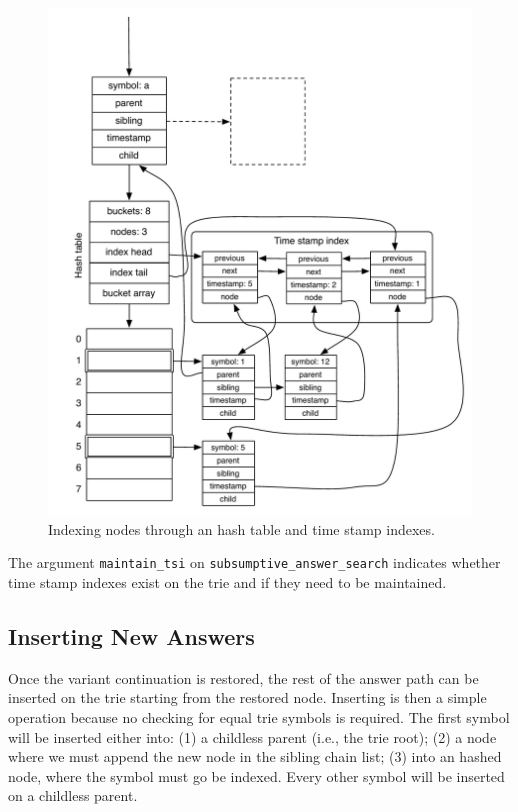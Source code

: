\begin{figure}[ht]
  \centering
    \includegraphics[scale=0.6]{hash_table_tst.pdf}
  \caption{Indexing nodes through an hash table and time stamp indexes.}
  \label{fig:hash_table_tst}
\end{figure}

The argument \texttt{maintain\_tsi} on \texttt{subsumptive\_answer\_search} indicates whether
time stamp indexes exist on the trie and if they need to be maintained.

\subsection{Inserting New Answers}

Once the variant continuation is restored, the rest of the answer path can be inserted on the trie starting
from the restored node. Inserting is then a simple operation because no checking for equal trie symbols is required.
The first symbol will be inserted either into: (1) a childless parent (i.e., the trie root); (2) a node where
we must append the new node in the sibling chain list; (3) into an hashed node, where the symbol must go be indexed.
Every other symbol will be inserted on a childless parent.

